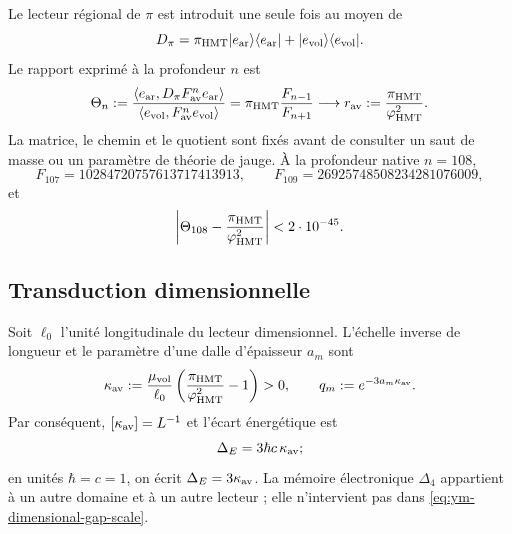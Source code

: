 Le lecteur régional de \(\pi\) est introduit une seule fois au moyen de
\begin{equation}
 D_\pi
 =\pi_{\rm HMT}|e_{\rm ar}\rangle\langle e_{\rm ar}|
  +|e_{\rm vol}\rangle\langle e_{\rm vol}|.
 \label{eq:ym-pi-regional-reader}
\end{equation}
Le rapport exprimé à la profondeur \(n\) est
\begin{equation}
 \Theta_n
 :=\frac{\langle e_{\rm ar},D_\pi F_{\rm av}^{n}e_{\rm ar}\rangle}
 {\langle e_{\rm vol},F_{\rm av}^{n}e_{\rm vol}\rangle}
 =\pi_{\rm HMT}\frac{F_{n-1}}{F_{n+1}}
 \longrightarrow
 r_{\rm av}:=\frac{\pi_{\rm HMT}}{\varphi_{\rm HMT}^{2}}.
 \label{eq:ym-target-free-av-limit}
\end{equation}
La matrice, le chemin et le quotient sont fixés avant de consulter un saut de masse ou un paramètre de théorie de jauge. À la profondeur native \(n=108\),
\begin{equation}
 F_{107}=10284720757613717413913,
 \qquad
 F_{109}=26925748508234281076009,
 \label{eq:ym-fibonacci-107-109}
\end{equation}
et
\begin{equation}
 \left|\Theta_{108}
 -\frac{\pi_{\rm HMT}}{\varphi_{\rm HMT}^{2}}\right|
 <2\cdot10^{-45}.
 \label{eq:ym-av-depth-108-error}
\end{equation}

\subsection{Transduction dimensionnelle}

Soit \(\ell_0\) l’unité longitudinale du lecteur dimensionnel. L’échelle
inverse de longueur et le paramètre d’une dalle d’épaisseur \(a_m\) sont
\begin{equation}
 \kappa_{\rm av}
 :=\frac{\mu_{\rm vol}}{\ell_0}
 \left(\frac{\pi_{\rm HMT}}{\varphi_{\rm HMT}^{2}}-1\right)>0,
 \qquad
 q_m:=e^{-3a_m\kappa_{\rm av}}.
 \label{eq:ym-dimensional-gap-scale}
\end{equation}
Par conséquent, \([\kappa_{\rm av}]=L^{-1}\) et l’écart énergétique est
\begin{equation}
 \Delta_E=3\hbar c\,\kappa_{\rm av};
 \label{eq:ym-energy-gap-units}
\end{equation}
en unités \(\hbar=c=1\), on écrit \(\Delta_E=3\kappa_{\rm av}\).
La mémoire électronique \(\Delta_4\) appartient à un autre domaine et à un autre
lecteur ; elle n’intervient pas dans \eqref{eq:ym-dimensional-gap-scale}.


